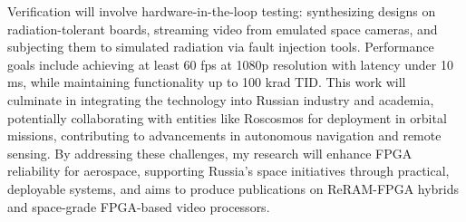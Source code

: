 \documentclass[a4paper,12pt]{article}
\begin{document}
\vspace{10pt}

Verification will involve hardware-in-the-loop testing: synthesizing designs on radiation-tolerant boards, streaming video from emulated space cameras, and subjecting them to simulated radiation via fault injection tools. Performance goals include achieving at least 60 fps at 1080p resolution with latency under 10 ms, while maintaining functionality up to 100 krad TID. This work will culminate in integrating the technology into Russian industry and academia, potentially collaborating with entities like Roscosmos for deployment in orbital missions, contributing to advancements in autonomous navigation and remote sensing. By addressing these challenges, my research will enhance FPGA reliability for aerospace, supporting Russia's space initiatives through practical, deployable systems, and aims to produce publications on ReRAM-FPGA hybrids and space-grade FPGA-based video processors.
\end{document}
